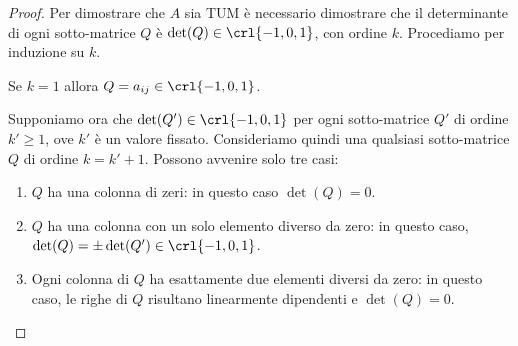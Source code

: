 \documentclass[\main/main.tex]{subfiles}
\begin{document}
\begin{proof}
  Per dimostrare che $A$ sia TUM è necessario dimostrare che il determinante di ogni sotto-matrice $Q$ è $\det(Q) \in \crl{-1, 0, 1}$, con ordine $k$. Procediamo per induzione su $k$.

  Se $k=1$ allora $Q = a_{ij} \in \crl{-1,0,1}$.

  Supponiamo ora che $\det(Q') \in \crl{-1,0,1}$ per ogni sotto-matrice $Q'$ di ordine $k'\geq1$, ove $k'$ è un valore fissato. Consideriamo quindi una qualsiasi sotto-matrice $Q$ di ordine $k = k'+1$. Possono avvenire solo tre casi:
  \begin{enumerate}
    \item $Q$ ha una colonna di zeri: in questo caso $\det(Q)=0$.
    \item $Q$ ha una colonna con un solo elemento diverso da zero: in questo caso, $\det(Q) = \pm \det(Q') \in \crl{-1,0,1}$.
    \item Ogni colonna di $Q$ ha esattamente due elementi diversi da zero: in questo caso, le righe di $Q$ risultano linearmente dipendenti e $\det(Q)=0$.
  \end{enumerate}
\end{proof}
\end{document}
